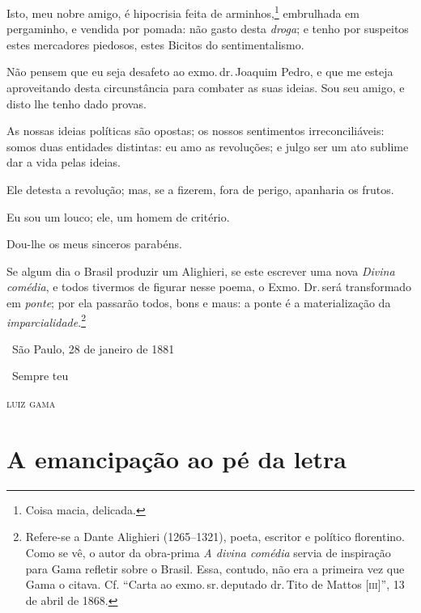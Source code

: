 Isto, meu nobre amigo, é hipocrisia feita de arminhos,\footnote{Coisa
  macia, delicada.} embrulhada em pergaminho, e vendida por pomada: não
gasto desta \emph{droga}; e tenho por suspeitos estes mercadores
piedosos, estes Bicitos do sentimentalismo.

Não pensem que eu seja desafeto ao exmo.\,dr.\,Joaquim Pedro, e que me
esteja aproveitando desta circunstância para combater as suas ideias.
Sou seu amigo, e disto lhe tenho dado provas.

As nossas ideias políticas são opostas; os nossos sentimentos
irreconciliáveis: somos duas entidades distintas: eu amo as revoluções;
e julgo ser um ato sublime dar a vida pelas ideias.

Ele detesta a revolução; mas, se a fizerem, fora de perigo, apanharia os
frutos.

Eu sou um louco; ele, um homem de critério.

Dou-lhe os meus sinceros parabéns.

Se algum dia o Brasil produzir um Alighieri, se este escrever uma nova 
\emph{Divina comédia}, e todos tivermos de figurar nesse poema, o Exmo.
Dr.\,será transformado em \emph{ponte}; por ela passarão todos, bons e
maus: a ponte é a materialização da \emph{imparcialidade}.\footnote{
  Refere-se a Dante Alighieri (1265--1321), poeta, escritor e político
  florentino. Como se vê, o autor da obra-prima \emph{A divina
  comédia} servia de inspiração para Gama refletir sobre o Brasil.
  Essa, contudo, não era a primeira vez que Gama o citava. Cf.
  ``Carta ao exmo.\,sr.\,deputado dr.\,Tito de Mattos {[}\textsc{iii}{]}'',
  13 de abril de 1868.}

\medskip

\hfill\ São Paulo, 28 de janeiro de 1881

\hfill\ Sempre teu

\hfill\textsc{luiz gama}

\part{A emancipação ao pé da letra}

